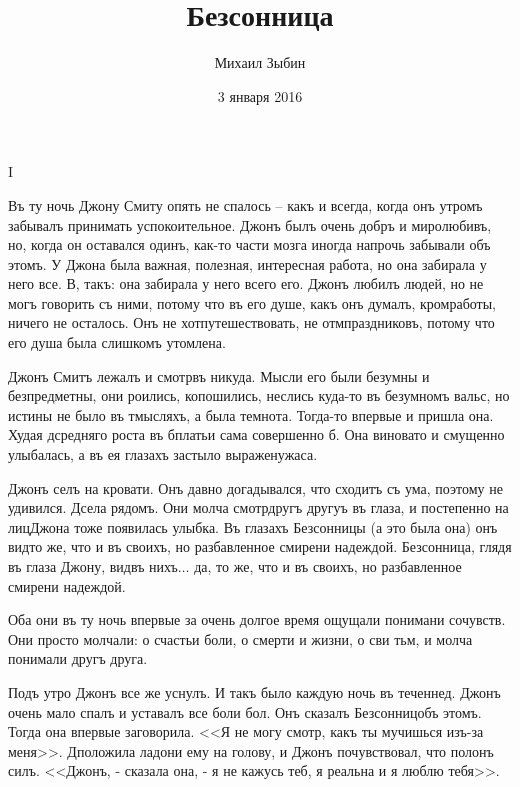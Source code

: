\documentclass{article}
\newcommand{\И}{{\fontencoding{X2}\selectfont\CYRII}} %
\newcommand{\и}{{\fontencoding{X2}\selectfont\cyrii}} %
\newcommand{\Е}{{\fontencoding{X2}\selectfont\CYRYAT}} %
\newcommand{\е}{{\fontencoding{X2}\selectfont\cyryat}} %
\newcommand{\Ф}{{\fontencoding{X2}\selectfont\CYROTLD}} %
\newcommand{\ф}{{\fontencoding{X2}\selectfont\cyrotld}} %
\newcommand{\Ы}{{\fontencoding{X2}\selectfont\CYRIZH}} %
\newcommand{\ы}{{\fontencoding{X2}\selectfont\cyrizh}} %
\begin{document}
\title{Безсонница}
\author{Михаил Зыбин}
\date{3 января 2016}
\maketitle

\begin{center}
I
\end{center}

Въ ту ночь Джону Смиту опять не спалось – какъ и всегда, когда онъ утромъ забывалъ принимать успокоительное. Джонъ былъ очень добръ и миролюбивъ, но, когда он оставался одинъ, как-то части мозга иногда напрочь забывали объ этомъ. У Джона была важная, полезная, интересная работа, но она забирала у него все. В, такъ: она забирала у него всего его. Джонъ любилъ людей, но не могъ говорить съ ними, потому что въ его душе, какъ онъ думалъ, кром\е работы, ничего не осталось. Онъ не хот путешествовать, не отм праздниковъ, потому что его душа была слишкомъ утомлена.

Джонъ Смитъ лежалъ и смотр въ никуда. Мысли его были безумны и безпредметны, они роились, копошились, неслись куда-то въ безумномъ вальс\е, но истины не было въ т мысляхъ, а была темнота. Тогда-то впервые и пришла она. Худая д средняго роста въ б плать\е и сама совершенно б. Она виновато и смущенно улыбалась, а въ ея глазахъ застыло выражен ужаса. 

Джонъ селъ на кровати. Онъ давно догадывался, что сходитъ съ ума, поэтому не удивился. Д села рядомъ. Они молча смотр другъ другуъ въ глаза, и постепенно на лиц\е Джона тоже появилась улыбка. Въ глазахъ Безсонницы (а это была она) онъ вид то же, что и въ своихъ, но разбавленное смирен и надеждой. Безсонница, глядя въ глаза Джону, вид въ нихъ$ \ldots $ да, то же, что и въ своихъ, но разбавленное смирен и надеждой. 

Оба они въ ту ночь впервые за очень долгое время ощущали пониман и сочувств. Они просто молчали: о счасть\е и боли, о смерти и жизни, о св\ет\е и тьм\е, и молча понимали другъ друга.

Подъ утро Джонъ все же уснулъ. И такъ было каждую ночь въ течен нед. Джонъ очень мало спалъ и уставалъ все бол и бол. Онъ сказалъ Безсонниц\е объ этомъ. Тогда она впервые заговорила. <<Я не могу смотр, какъ ты мучишься изъ-за меня>>. Д положила ладони ему на голову, и Джонъ почувствовал, что полонъ силъ. <<Джонъ, -  сказала она, - я не кажусь теб\е, я реальна и я люблю тебя>>.
\end{document}
